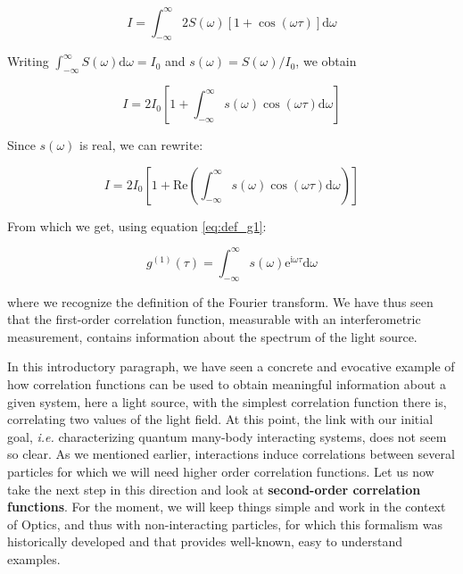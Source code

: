 \begin{equation}
    I=\int_{-\infty}^{\infty} 2 S(\omega)[1+\cos (\omega \tau)] \mathrm{d} \omega
\end{equation}

\noindent Writing $\int_{-\infty}^{\infty} S(\omega) \mathrm{d} \omega=I_{0}$ and $s(\omega)=S(\omega) / I_{0}$, we obtain

\begin{equation}
    I=2 I_{0}\left[1+\int_{-\infty}^{\infty} s(\omega) \cos (\omega \tau) \mathrm{d} \omega\right]
\end{equation}

\noindent Since $s(\omega)$ is real, we can rewrite:

\begin{equation}
    I=2 I_{0}\left[1+\mathrm{Re} \left(\int_{-\infty}^{\infty} s(\omega) \cos (\omega \tau) \mathrm{d} \omega\right)\right]
\end{equation}

\noindent From which we get, using equation \ref{eq:def_g1}:

\begin{equation}
    g^{(1)}(\tau)=\int_{-\infty}^{\infty} s(\omega) \mathrm{e}^{\mathrm{i} \omega \tau} \mathrm{d} \omega
\end{equation}

\noindent where we recognize the definition of the Fourier transform. We have thus seen that the first-order correlation function, measurable with an interferometric measurement, contains information about the spectrum of the light source. 




In this introductory paragraph, we have seen a concrete and evocative example of how correlation functions can be used to obtain meaningful information about a given system, here a light source, with the simplest correlation function there is, correlating two values of the light field. At this point, the link with our initial goal, {\it i.e.} characterizing quantum many-body interacting systems, does not seem so clear. As we mentioned earlier, interactions induce correlations between several particles for which we will need higher order correlation functions. Let us now take the next step in this direction and look at \textbf{second-order correlation functions}. For the moment, we will keep things simple and work in the context of Optics, and thus with non-interacting particles, for which this formalism was historically developed and that provides well-known, easy to understand examples.

